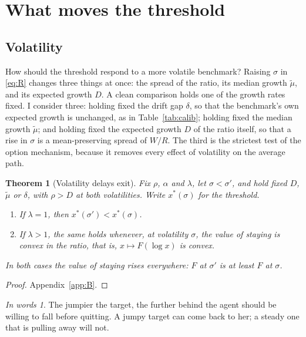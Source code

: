 \documentclass[12pt]{article}
\newtheorem{theorem}{Theorem}
\theoremstyle{definition}
\theoremstyle{remark}
\newtheorem*{inwords}{In words}
\newcommand{\mut}{\tilde\mu}
\theoremstyle{plain}
\theoremstyle{definition}
\begin{document}
\section{What moves the threshold}\label{sec:vol}

\subsection{Volatility}

How should the threshold respond to a more volatile benchmark? Raising $\sigma$ in \eqref{eq:R} changes three things at once: the spread of the ratio, its median growth $\mut$, and its expected growth $D$. A clean comparison holds one of the growth rates fixed. I consider three: holding fixed the drift gap $\delta$, so that the benchmark's own expected growth is unchanged, as in Table~\ref{tab:calib}; holding fixed the median growth $\mut$; and holding fixed the expected growth $D$ of the ratio itself, so that a rise in $\sigma$ is a mean-preserving spread of $W/R$. The third is the strictest test of the option mechanism, because it removes every effect of volatility on the average path.

\begin{theorem}[Volatility delays exit]\label{thm:vol}
Fix $\rho$, $\alpha$ and $\lambda$, let $\sigma<\sigma'$, and hold fixed $D$, $\mut$ or $\delta$, with $\rho>D$ at both volatilities. Write $x^*(\sigma)$ for the threshold.
\begin{enumerate}[label=(\alph*)]
\item If $\lambda=1$, then $x^*(\sigma')<x^*(\sigma)$.
\item If $\lambda>1$, the same holds whenever, at volatility $\sigma$, the value of staying is convex in the ratio, that is, $x\mapsto F(\log x)$ is convex.
\end{enumerate}
In both cases the value of staying rises everywhere: $F$ at $\sigma'$ is at least $F$ at $\sigma$.
\end{theorem}

\begin{proof}
Appendix~\ref{app:B}.
\end{proof}

\begin{inwords}
The jumpier the target, the further behind the agent should be willing to fall before quitting. A jumpy target can come back to her; a steady one that is pulling away will not.
\end{inwords}
\end{document}
